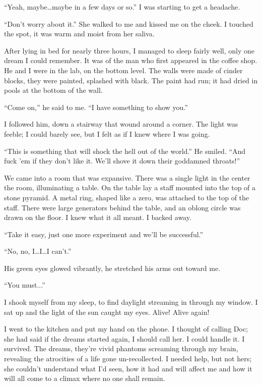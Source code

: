 \documentclass[
]{article}
\begin{document}
``Yeah, maybe\ldots maybe in a few days or so.'' I was starting to get a
headache.

``Don't worry about it.'' She walked to me and kissed me on the cheek. I
touched the spot, it was warm and moist from her saliva.

After lying in bed for nearly three hours, I managed to sleep fairly
well, only one dream I could remember. It was of the man who first
appeared in the coffee shop. He and I were in the lab, on the bottom
level. The walls were made of cinder blocks, they were painted, splashed
with black. The paint had run; it had dried in pools at the bottom of
the wall.

``Come on,'' he said to me. ``I have something to show you.''

I followed him, down a stairway that wound around a corner. The light
was feeble; I could barely see, but I felt as if I knew where I was
going.

``This is something that will shock the hell out of the world.'' He
smiled. ``And fuck 'em if they don't like it. We'll shove it down their
goddamned throats!''

We came into a room that was expansive. There was a single light in the
center the room, illuminating a table. On the table lay a staff mounted
into the top of a stone pyramid. A metal ring, shaped like a zero, was
attached to the top of the staff. There were large generators behind the
table, and an oblong circle was drawn on the floor. I knew what it all
meant. I backed away.

``Take it easy, just one more experiment and we'll be successful.''

``No, no, I\ldots I\ldots I can't.''

His green eyes glowed vibrantly, he stretched his arms out toward me.

``You must...''

I shook myself from my sleep, to find daylight streaming in through my
window. I sat up and the light of the sun caught my eyes. Alive! Alive
again!

I went to the kitchen and put my hand on the phone. I thought of calling
Doc; she had said if the dreams started again, I should call her. I
could handle it. I survived. The dreams, they're vivid phantoms
screaming through my brain, revealing the atrocities of a life gone
un-recollected. I needed help, but not hers; she couldn't understand
what I'd seen, how it had and will affect me and how it will all come to
a climax where no one shall remain.
\end{document}
